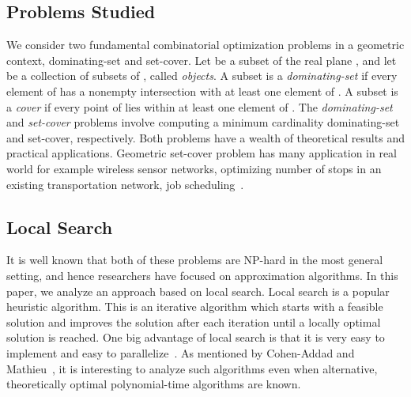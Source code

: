 \documentclass[a4paper,11pt]{article}
\begin{document}
\subsection{Problems Studied}
We consider two fundamental combinatorial optimization problems in a geometric context, dominating-set and set-cover. Let   be a subset of the real plane , and let  be a collection of subsets of , called \emph{objects}. A subset  is a \emph{dominating-set} if every element of  has a nonempty intersection with at least one element of . A subset  is a \emph{cover} if every point of  lies within at least one element of . The \emph{dominating-set} and \emph{set-cover} problems involve computing a minimum cardinality dominating-set and set-cover, respectively. Both problems have a wealth of theoretical results and practical applications. 
Geometric set-cover 
problem has many application in real world for example wireless sensor 
networks, optimizing number of stops in an existing transportation network, job 
scheduling~\cite{BansalP14,ClarksonV07,HarPel12}.


\subsection{Local Search}
{It is well known that both of these problems are NP-hard in the most general setting, and hence researchers have focused on approximation algorithms. In this paper, we analyze an approach based on local search.}
Local search is a popular heuristic algorithm. This is an iterative  algorithm 
which starts with a feasible solution and improves the solution after each 
iteration until a locally optimal solution is reached. One big advantage of 
local search  is that it is very easy to implement and  easy to 
parallelize~\cite{Cohen-AddadM15}. As mentioned by Cohen-Addad and 
Mathieu~\cite{Cohen-AddadM15}, it is interesting to analyze such algorithms 
even when  alternative, theoretically optimal polynomial-time algorithms are 
known. 
\end{document}
